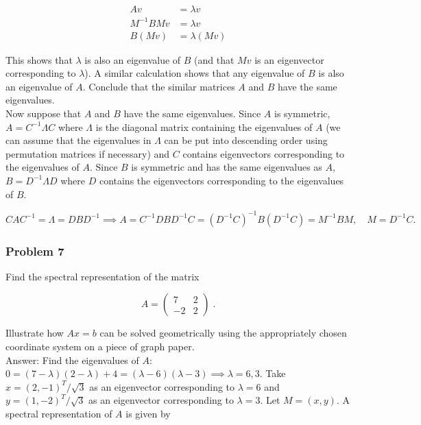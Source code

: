 \documentclass{article}
\begin{document}
\begin{align*}
Av &= \lambda v \\
M^{-1}BMv &= \lambda v \\
B(Mv) &= \lambda (Mv)
\end{align*}

This shows that $\lambda$ is also an eigenvalue of $B$ (and that $Mv$ is an eigenvector corresponding to $\lambda$). A similar calculation shows that any eigenvalue of $B$ is also an eigenvalue of $A$. Conclude that the similar matrices $A$ and $B$ have the same eigenvalues. \\

Now suppose that $A$ and $B$ have the same eigenvalues. Since $A$ is symmetric, $A = C^{-1}\Lambda C$ where $\Lambda$ is the diagonal matrix containing the eigenvalues of $A$ (we can assume that the eigenvalues in $\Lambda$ can be put into descending order using permutation matrices if necessary) and $C$ contains eigenvectors corresponding to the eigenvalues of $A$. Since $B$ is symmetric and has the same eigenvalues as $A$, $B = D^{-1}\Lambda D$ where $D$ contains the eigenvectors corresponding to the eigenvalues of $B$. 

$$
CAC^{-1} = \Lambda = DBD^{-1} \implies A = C^{-1}DBD^{-1}C = (D^{-1}C)^{-1}B(D^{-1}C) = M^{-1}BM, \quad M = D^{-1}C.
$$

\subsubsection*{Problem 7}

Find the spectral representation of the matrix 

$$ 
A = \begin{pmatrix}
7 & 2 \\ -2 & 2
\end{pmatrix} \;.
$$

Illustrate how $Ax = b$ can be solved geometrically using the appropriately chosen coordinate system on a piece of graph paper. \\

Answer: Find the eigenvalues of $A$: $0 = (7-\lambda)(2-\lambda) + 4 = (\lambda - 6)(\lambda - 3) \implies \lambda = 6,3$. Take $x = (2,-1)^T / \sqrt{3}$ as an eigenvector corresponding to $\lambda = 6$ and $y = (1, -2)^T/\sqrt{3}$ as an eigenvector corresponding to $\lambda = 3$. Let $M = (x , y)$. A spectral representation of $A$ is given by
\end{document}

